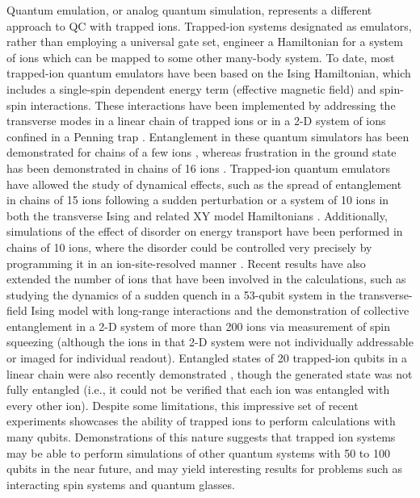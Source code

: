 \documentclass[%
reprint,
 amsmath,amssymb,
]{revtex4-1}
\begin{document}
Quantum emulation, or analog quantum simulation, represents a different approach to QC with trapped ions. Trapped-ion systems designated as emulators, rather than employing a universal gate set, engineer a  Hamiltonian for a system of ions which can be mapped to some other many-body system. To date, most trapped-ion quantum emulators have been based on the Ising Hamiltonian, which includes a single-spin dependent energy term (effective magnetic field) and spin-spin interactions. These interactions have been implemented by addressing the transverse modes in a linear chain of trapped ions \cite{KimTransverse2009} or in a 2-D system of ions confined in a Penning trap \cite{Britton2012}. Entanglement in these quantum simulators has been demonstrated for chains of a few ions \cite{KimFrustration2010}, whereas frustration in the ground state has been demonstrated in chains of 16 ions \cite{IslamIsingMagnetism2013}. Trapped-ion quantum emulators have allowed the study of dynamical effects, such as the spread of entanglement in chains of 15 ions following a sudden perturbation \cite{JurcevicQuasiparticle2014} or a system of 10 ions in both the transverse Ising and related XY model Hamiltonians \cite{JurcevicQuasiparticle2014,RichermeNonlocal2014}.  Additionally, simulations of the effect of disorder on energy transport have been performed in chains of 10 ions, where the disorder could be controlled very precisely by programming it in an ion-site-resolved manner \cite{SmithQTransport2016, MaierQTRansport2019}.  Recent results have also extended the number of ions that have been involved in the calculations, such as studying the dynamics of a sudden quench in a 53-qubit system in the transverse-field Ising model with long-range interactions \cite{Zhang53IonSim2017} and the demonstration of collective entanglement in a 2-D system of more than 200 ions via measurement of spin squeezing \cite{BohnetSpinDynamics2016} (although the ions in that 2-D system were not individually addressable or imaged for individual readout). Entangled states of 20 trapped-ion qubits in a linear chain were also recently demonstrated \cite{Friis20QubitEntanglement2018}, though the generated state was not fully entangled (i.e., it could not be verified that each ion was entangled with every other ion). Despite some limitations, this impressive set of recent experiments showcases the ability of trapped ions to perform calculations with many qubits. Demonstrations of this nature suggests that trapped ion systems may be able to perform simulations of other quantum systems with 50 to 100 qubits in the near future, and may yield interesting results for problems such as interacting spin systems and quantum glasses.
\end{document}
